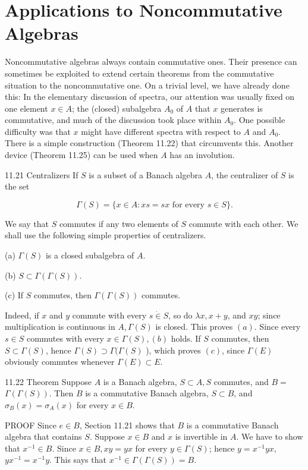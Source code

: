 \documentclass[10pt]{article}
\begin{document}
\section{Applications to Noncommutative Algebras}
Noncommutative algebras always contain commutative ones. Their presence can sometimes be exploited to extend certain theorems from the commutative situation to the noncommutative one. On a trivial level, we have already done this: In the elementary discussion of spectra, our attention was usually fixed on one element $x \in A$;
the (closed) subalgebra $A_{0}$ of $A$ that $x$ generates is commutative, and much of the discussion took place within $A_{0}$. One possible difficulty was that $x$ might have different spectra with respect to $A$ and $A_{0}$. There is a simple construction (Theorem 11.22) that circumvents this. Another device (Theorem 11.25) can be used when $A$ has an involution.

11.21 Centralizers If $S$ is a subset of a Banach algebra $A$, the centralizer of $S$ is the set

$$
\Gamma(S)=\{x \in A: x s=s x \text { for every } s \in S\} .
$$

We say that $S$ commutes if any two elements of $S$ commute with each other. We shall use the following simple properties of centralizers.

(a) $\Gamma(S)$ is a closed subalgebra of $A$.

(b) $S \subset \Gamma(\Gamma(S))$.

(c) If $S$ commutes, then $\Gamma(\Gamma(S))$ commutes.

Indeed, if $x$ and $y$ commute with every $s \dot{\in} S$, so do $\lambda x, x+y$, and $x y$; since multiplication is continuous in $A, \Gamma(S)$ is closed. This proves $(a)$. Since every $s \in S$ commutes with every $x \in \Gamma(S),(b)$ holds. If $S$ commutes, then $S \subset \Gamma(S)$, hence $\Gamma(S) \supset \Gamma(\Gamma(S)$ ), which proves $(c)$, since $\Gamma(E)$ obviously commutes whenever $\Gamma(E) \subset E$.

11.22 Theorem Suppose $A$ is a Banach algebra, $S \subset A, S$ commutes, and $B=$ $\Gamma(\Gamma(S))$. Then $B$ is a commutative Banach algebra, $S \subset B$, and $\sigma_{B}(x)=\sigma_{A}(x)$ for every $x \in B$.

PROOF Since $e \in B$, Section 11.21 shows that $B$ is a commutative Banach algebra that contains $S$. Suppose $x \in B$ and $x$ is invertible in $A$. We have to show that $x^{-1} \in B$. Since $x \in B, x y=y x$ for every $y \in \Gamma(S)$; hence $y=x^{-1} y x$, $y x^{-1}=x^{-1} y$. This says that $x^{-1} \in \Gamma(\Gamma(S))=B$.
\end{document}
